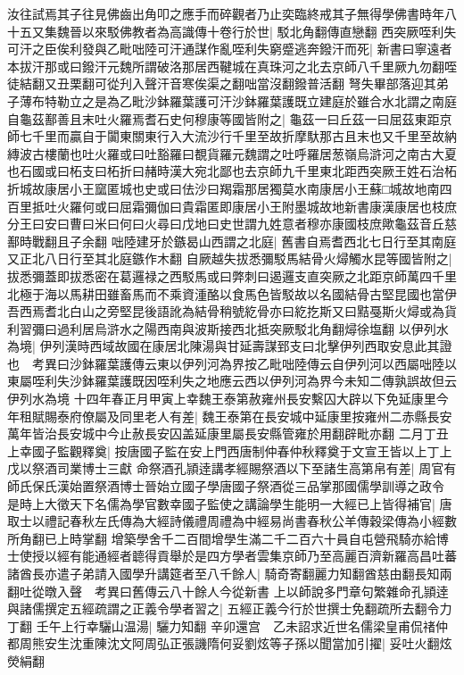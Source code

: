 汝往試焉其子往見佛齒出角叩之應手而碎觀者乃止奕臨終戒其子無得學佛書時年八十五又集魏晉以來駁佛教者為高識傳十卷行於世|{
	駁北角翻傳直戀翻}
西突厥咥利失可汗之臣俟利發與乙毗咄陸可汗通謀作亂咥利失窮蹙逃奔鏺汗而死|{
	新書曰寧遠者本拔汗那或曰鏺汗元魏所謂破洛那居西鞬城在真珠河之北去京師八千里厥九勿翻咥徒結翻又丑栗翻可從刋入聲汗音寒俟渠之翻咄當沒翻鏺普活翻}
弩失畢部落迎其弟子薄布特勒立之是為乙毗沙鉢羅葉護可汗沙鉢羅葉護既立建庭於雖合水北謂之南庭自龜茲鄯善且末吐火羅焉耆石史何穆康等國皆附之|{
	龜茲一曰丘茲一曰屈茲東距京師七千里而贏自于闐東關東行入大流沙行千里至故折摩馱那古且末也又千里至故納縳波古樓蘭也吐火羅或曰吐豁羅曰覩貨羅元魏謂之吐呼羅居葱嶺烏滸河之南古大夏也石國或曰柘支曰柘折曰赭時漢大宛北鄙也去京師九千里東北距西突厥王姓石治柘折城故康居小王窳匿城也史或曰佉沙曰羯霜那居獨莫水南康居小王蘇□城故地南四百里抵吐火羅何或曰屈霜彌伽曰貴霜匿即康居小王附墨城故地新書康漢康居也枝庶分王曰安曰曹曰米曰何曰火尋曰戊地曰史世謂九姓意者穆亦康國枝庶歟龜茲音丘慈鄯時戰翻且子余翻}
咄陸建牙於鏃曷山西謂之北庭|{
	舊書自焉耆西北七日行至其南庭又正北八日行至其北庭鏃作木翻}
自厥越失拔悉彌駁馬結骨火燖觸水昆等國皆附之|{
	拔悉彌蓋即拔悉密在葛邏禄之西駁馬或曰弊刺曰遏邏支直突厥之北距京師萬四千里北極于海以馬耕田雖畜馬而不乘資湩酪以食馬色皆駁故以名國結骨古堅昆國也當伊吾西焉耆北白山之旁堅昆後語訛為結骨稍號紇骨亦曰紇扢斯又曰黠戞斯火燖或為貨利習彌曰過利居烏滸水之陽西南與波斯接西北抵突厥駁北角翻燖徐塩翻}
以伊列水為境|{
	伊列漢時西域故國在康居北陳湯與甘延壽謀郅支曰北擊伊列西取安息此其證也　考異曰沙鉢羅葉護傳云東以伊列河為界按乙毗咄陸傳云自伊列河以西屬咄陸以東屬咥利失沙鉢羅葉護既因咥利失之地應云西以伊列河為界今未知二傳孰誤故但云伊列水為境}
十四年春正月甲寅上幸魏王泰第赦雍州長安繫囚大辟以下免延康里今年租賦賜泰府僚屬及同里老人有差|{
	魏王泰第在長安城中延康里按雍州二赤縣長安萬年皆治長安城中今止赦長安囚盖延康里屬長安縣管雍於用翻辟毗亦翻}
二月丁丑上幸國子監觀釋奠|{
	按唐國子監在安上門西唐制仲春仲秋釋奠于文宣王皆以上丁上戊以祭酒司業博士三獻}
命祭酒孔頴逹講孝經賜祭酒以下至諸生高第帛有差|{
	周官有師氏保氏漢始置祭酒博士晉始立國子學唐國子祭酒從三品掌那國儒學訓導之政令}
是時上大徵天下名儒為學官數幸國子監使之講論學生能明一大經已上皆得補官|{
	唐取士以禮記春秋左氏傳為大經詩儀禮周禮為中經易尚書春秋公羊傳穀梁傳為小經數所角翻已上時掌翻}
增築學舍千二百間增學生滿二千二百六十員自屯營飛騎亦給博士使授以經有能通經者聼得貢舉於是四方學者雲集京師乃至高麗百濟新羅高昌吐蕃諸酋長亦遣子弟請入國學升講筵者至八千餘人|{
	騎奇寄翻麗力知翻酋慈由翻長知兩翻吐從暾入聲　考異曰舊傳云八十餘人今從新書}
上以師說多門章句繁雜命孔頴逹與諸儒撰定五經疏謂之正義令學者習之|{
	五經正義今行於世撰士免翻疏所去翻令力丁翻}
壬午上行幸驪山温湯|{
	驪力知翻}
辛卯還宫　乙未詔求近世名儒梁皇甫侃禇仲都周熊安生沈重陳沈文阿周弘正張譏隋何妥劉炫等子孫以聞當加引擢|{
	妥吐火翻炫熒絹翻}
